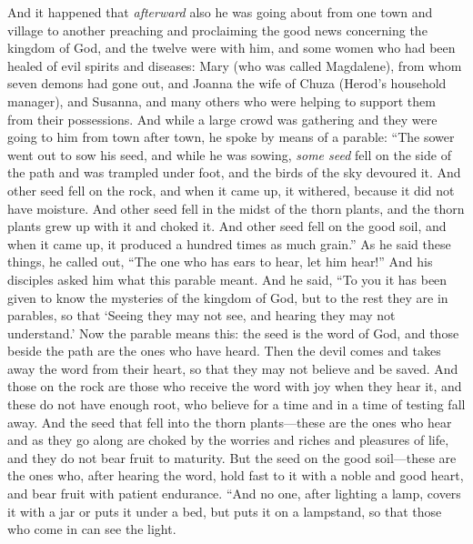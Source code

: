 \begin{biblechapter} %
 And it happened that \textit{afterward} also he was going about from one town and village to another preaching and proclaiming the good news concerning the kingdom of God, and the twelve were with him,
\verse and some women who had been healed of evil spirits and diseases: Mary (who was called Magdalene), from whom seven demons had gone out,
\verse and Joanna the wife of Chuza (Herod’s household manager), and Susanna, and many others who were helping to support them from their possessions.
 And while a large crowd was gathering and they were going to him from town after town, he spoke by means of a parable:
\verse “The sower went out to sow his seed, and while he was sowing, \textit{some seed} fell on the side of the path and was trampled under foot, and the birds of the sky devoured it.
\verse And other seed fell on the rock, and when it came up, it withered, because it did not have moisture.
\verse And other seed fell in the midst of the thorn plants, and the thorn plants grew up with it and choked it.
\verse And other seed fell on the good soil, and when it came up, it produced a hundred times as much grain.” As he said these things, he called out, “The one who has ears to hear, let him hear!”
 And his disciples asked him what this parable meant.
\verse And he said, “To you it has been given to know the mysteries of the kingdom of God, but to the rest they are in parables, so that ‘Seeing they may not see, 
and hearing they may not understand.’
 Now the parable means this: the seed is the word of God,
\verse and those beside the path are the ones who have heard. Then the devil comes and takes away the word from their heart, so that they may not believe and be saved.
\verse And those on the rock are those who receive the word with joy when they hear it, and these do not have enough root, who believe for a time and in a time of testing fall away.
\verse And the seed that fell into the thorn plants—these are the ones who hear and as they go along are choked by the worries and riches and pleasures of life, and they do not bear fruit to maturity.
\verse But the seed on the good soil—these are the ones who, after hearing the word, hold fast to it with a noble and good heart, and bear fruit with patient endurance.
 “And no one, after lighting a lamp, covers it with a jar or puts it under a bed, but puts it on a lampstand, so that those who come in can see the light.

\end{biblechapter}
